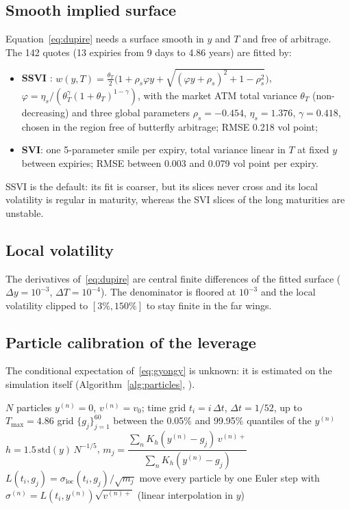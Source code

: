 \documentclass[11pt,a4paper]{article}
\newcommand{\sloc}{\sigma_{\mathrm{loc}}}
\begin{document}
\subsection{Smooth implied surface}
Equation~\eqref{eq:dupire} needs a surface smooth in $y$ and $T$ and free of arbitrage. The 142 quotes (13 expiries
from 9 days to 4.86 years) are fitted by:
\begin{itemize}
\item \textbf{SSVI} \cite{gatheral2014}: $w(y, T) = \frac{\theta_T}{2}\big(1 + \rho_s \varphi y + \sqrt{(\varphi y + \rho_s)^2 + 1 - \rho_s^2}\big)$,
$\varphi = \eta_s / (\theta_T^{\gamma}(1+\theta_T)^{1-\gamma})$, with the market ATM total variance $\theta_T$
(non-decreasing) and three global parameters $\rho_s = -0.454$, $\eta_s = 1.376$, $\gamma = 0.418$, chosen in the
region free of butterfly arbitrage; RMSE 0.218 vol point;
\item \textbf{SVI}: one 5-parameter smile per expiry, total variance linear in $T$ at fixed $y$ between expiries;
RMSE between 0.003 and 0.079 vol point per expiry.
\end{itemize}
SSVI is the default: its fit is coarser, but its slices never cross and its local volatility is regular in maturity,
whereas the SVI slices of the long maturities are unstable.

\subsection{Local volatility}
The derivatives of~\eqref{eq:dupire} are central finite differences of the fitted surface ($\Delta y = 10^{-3}$,
$\Delta T = 10^{-4}$). The denominator is floored at $10^{-3}$ and the local volatility clipped to $[3\%, 150\%]$
to stay finite in the far wings.

\subsection{Particle calibration of the leverage}
The conditional expectation of~\eqref{eq:gyongy} is unknown: it is estimated on the simulation itself
(Algorithm~\ref{alg:particles}, \cite{guyon2012}).

\begin{algorithm}[h]
\caption{Particle calibration of the leverage function}
\label{alg:particles}
\begin{algorithmic}[1]
\State $N$ particles $y^{(n)} = 0$, $v^{(n)} = v_0$; time grid $t_i = i\,\Delta t$, $\Delta t = 1/52$, up to $T_{\max} = 4.86$
  \State grid $\{g_j\}_{j=1}^{60}$ between the 0.05\% and 99.95\% quantiles of the $y^{(n)}$
  \State $h = 1.5\,\mathrm{std}(y)\,N^{-1/5}$, \quad $m_j = \dfrac{\sum_n K_h(y^{(n)} - g_j)\, v^{(n)+}}{\sum_n K_h(y^{(n)} - g_j)}$ 
  \State $L(t_i, g_j) = \sloc(t_i, g_j) / \sqrt{m_j}$
  \State move every particle by one Euler step with $\sigma^{(n)} = L(t_i, y^{(n)})\sqrt{v^{(n)+}}$ (linear interpolation in $y$)
\EndFor
\end{algorithmic}
\end{algorithm}
\end{document}
